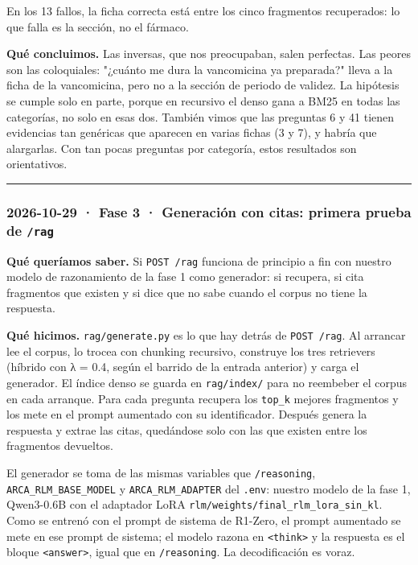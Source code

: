 En los 13 fallos, la ficha correcta está entre los cinco fragmentos recuperados: lo que falla
es la sección, no el fármaco.

\textbf{Qué concluimos.} Las inversas, que nos preocupaban, salen perfectas. Las peores son las
coloquiales: "¿cuánto me dura la vancomicina ya preparada?" lleva a la ficha de la vancomicina,
pero no a la sección de periodo de validez. La hipótesis se cumple solo en parte, porque en
recursivo el denso gana a BM25 en todas las categorías, no solo en esas dos. También vimos que
las preguntas 6 y 41 tienen evidencias tan genéricas que aparecen en varias fichas (3 y 7), y
habría que alargarlas. Con tan pocas preguntas por categoría, estos resultados son orientativos.

\begin{center}\rule{0.5\linewidth}{0.5pt}\end{center}

\subsubsection{\texorpdfstring{2026-10-29 · Fase 3 · Generación con citas: primera prueba de \texttt{/\allowbreak{}rag}}{2026-10-29 · Fase 3 · Generación con citas: primera prueba de /rag}}

\textbf{Qué queríamos saber.} Si \texttt{POST /\allowbreak{}rag} funciona de principio a fin con nuestro modelo de
razonamiento de la fase 1 como generador: si recupera, si cita fragmentos que existen y si dice
que no sabe cuando el corpus no tiene la respuesta.

\textbf{Qué hicimos.} \texttt{rag/\allowbreak{}generate.py} es lo que hay detrás de \texttt{POST /\allowbreak{}rag}. Al arrancar lee el corpus,
lo trocea con chunking recursivo, construye los tres retrievers (híbrido con λ = 0.4, según el
barrido de la entrada anterior) y carga el generador. El índice denso se guarda en \texttt{rag/\allowbreak{}index/\allowbreak{}}
para no reembeber el corpus en cada arranque. Para cada pregunta recupera los \texttt{top\_\allowbreak{}k} mejores
fragmentos y los mete en el prompt aumentado con su identificador. Después genera la respuesta y
extrae las citas, quedándose solo con las que existen entre los fragmentos devueltos.

El generador se toma de las mismas variables que \texttt{/\allowbreak{}reasoning}, \texttt{ARCA\_\allowbreak{}RLM\_\allowbreak{}BASE\_\allowbreak{}MODEL} y
\texttt{ARCA\_\allowbreak{}RLM\_\allowbreak{}ADAPTER} del \texttt{.env}: nuestro modelo de la fase 1, Qwen3-0.6B con el adaptador LoRA
\texttt{rlm/\allowbreak{}weights/\allowbreak{}final\_\allowbreak{}rlm\_\allowbreak{}lora\_\allowbreak{}sin\_\allowbreak{}kl}. Como se entrenó con el prompt de sistema de R1-Zero, el
prompt aumentado se mete en ese prompt de sistema; el modelo razona en \texttt{\textless{}think\textgreater{}} y la respuesta
es el bloque \texttt{\textless{}answer\textgreater{}}, igual que en \texttt{/\allowbreak{}reasoning}. La decodificación es voraz.

